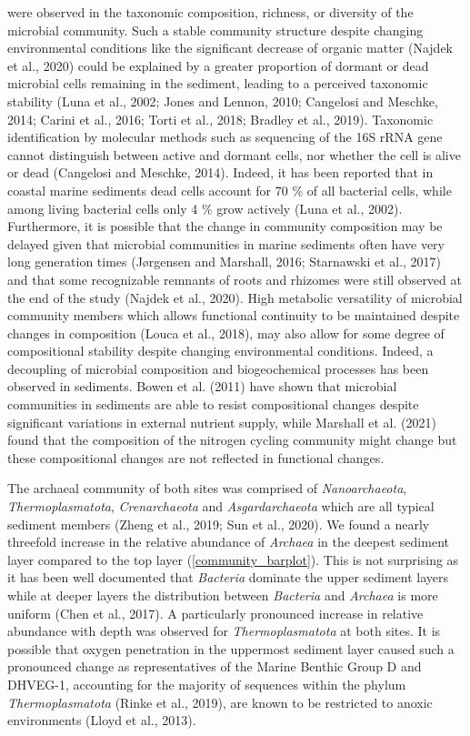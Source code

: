 \documentclass[12pt,]{article}
\begin{document}
were observed in the taxonomic composition, richness, or diversity of
the microbial community. Such a stable community structure despite
changing environmental conditions like the significant decrease of
organic matter (Najdek et al., 2020) could be explained by a greater
proportion of dormant or dead microbial cells remaining in the sediment,
leading to a perceived taxonomic stability (Luna et al., 2002; Jones and
Lennon, 2010; Cangelosi and Meschke, 2014; Carini et al., 2016; Torti et
al., 2018; Bradley et al., 2019). Taxonomic identification by molecular
methods such as sequencing of the 16S rRNA gene cannot distinguish
between active and dormant cells, nor whether the cell is alive or dead
(Cangelosi and Meschke, 2014). Indeed, it has been reported that in
coastal marine sediments dead cells account for 70 \si{\percent} of all
bacterial cells, while among living bacterial cells only 4 \si{\percent}
grow actively (Luna et al., 2002). Furthermore, it is possible that the
change in community composition may be delayed given that microbial
communities in marine sediments often have very long generation times
(Jørgensen and Marshall, 2016; Starnawski et al., 2017) and that some
recognizable remnants of roots and rhizomes were still observed at the
end of the study (Najdek et al., 2020). High metabolic versatility of
microbial community members which allows functional continuity to be
maintained despite changes in composition (Louca et al., 2018), may also
allow for some degree of compositional stability despite changing
environmental conditions. Indeed, a decoupling of microbial composition
and biogeochemical processes has been observed in sediments. Bowen et
al. (2011) have shown that microbial communities in sediments are able
to resist compositional changes despite significant variations in
external nutrient supply, while Marshall et al. (2021) found that the
composition of the nitrogen cycling community might change but these
compositional changes are not reflected in functional changes.

The archaeal community of both sites was comprised of
\emph{Nanoarchaeota}, \emph{Thermoplasmatota}, \emph{Crenarchaeota} and
\emph{Asgardarchaeota} which are all typical sediment members (Zheng et
al., 2019; Sun et al., 2020). We found a nearly threefold increase in
the relative abundance of \emph{Archaea} in the deepest sediment layer
compared to the top layer (\autoref{community_barplot}). This is not
surprising as it has been well documented that \emph{Bacteria} dominate
the upper sediment layers while at deeper layers the distribution
between \emph{Bacteria} and \emph{Archaea} is more uniform (Chen et al.,
2017). A particularly pronounced increase in relative abundance with
depth was observed for \emph{Thermoplasmatota} at both sites. It is
possible that oxygen penetration in the uppermost sediment layer caused
such a pronounced change as representatives of the Marine Benthic Group
D and DHVEG-1, accounting for the majority of sequences within the
phylum \emph{Thermoplasmatota} (Rinke et al., 2019), are known to be
restricted to anoxic environments (Lloyd et al., 2013).
\end{document}
